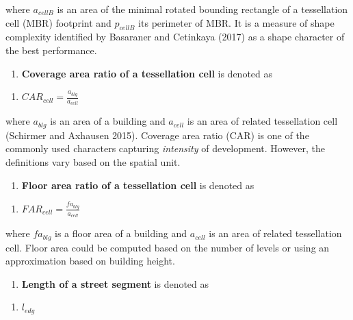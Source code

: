 \documentclass[
  letterpaper,
  DIV=11,
  numbers=noendperiod]{scrartcl}
\providecommand{\tightlist}{%
  \setlength{\itemsep}{0pt}\setlength{\parskip}{0pt}}\usepackage{longtable,booktabs,array}
\begin{document}
where \(a_{cellB}\) is an area of the minimal rotated bounding rectangle
of a tessellation cell (MBR) footprint and \(p_{cellB}\) its perimeter
of MBR. It is a measure of shape complexity identified by Basaraner and
Cetinkaya (2017) as a shape character of the best performance.

\begin{enumerate}
\def\labelenumi{\arabic{enumi}.}
\setcounter{enumi}{14}
\tightlist
\item
  \textbf{Coverage area ratio of a tessellation cell} is denoted as
\end{enumerate}

\begin{enumerate}
\def\labelenumi{(\arabic{enumi})}
\setcounter{enumi}{14}
\tightlist
\item
  \(CAR_{cell} = \frac{a_{blg}}{a_{cell}}\)
\end{enumerate}

where \(a_{blg}\) is an area of a building and \(a_{cell}\) is an area
of related tessellation cell (Schirmer and Axhausen 2015). Coverage area
ratio (CAR) is one of the commonly used characters capturing
\emph{intensity} of development. However, the definitions vary based on
the spatial unit.

\begin{enumerate}
\def\labelenumi{\arabic{enumi}.}
\setcounter{enumi}{15}
\tightlist
\item
  \textbf{Floor area ratio of a tessellation cell} is denoted as
\end{enumerate}

\begin{enumerate}
\def\labelenumi{(\arabic{enumi})}
\setcounter{enumi}{15}
\tightlist
\item
  \(FAR_{cell} = \frac{fa_{blg}}{a_{cell}}\)
\end{enumerate}

where \(fa_{blg}\) is a floor area of a building and \(a_{cell}\) is an
area of related tessellation cell. Floor area could be computed based on
the number of levels or using an approximation based on building height.

\begin{enumerate}
\def\labelenumi{\arabic{enumi}.}
\setcounter{enumi}{16}
\tightlist
\item
  \textbf{Length of a street segment} is denoted as
\end{enumerate}

\begin{enumerate}
\def\labelenumi{(\arabic{enumi})}
\setcounter{enumi}{16}
\tightlist
\item
  \(l_{edg}\)
\end{enumerate}
\end{document}
